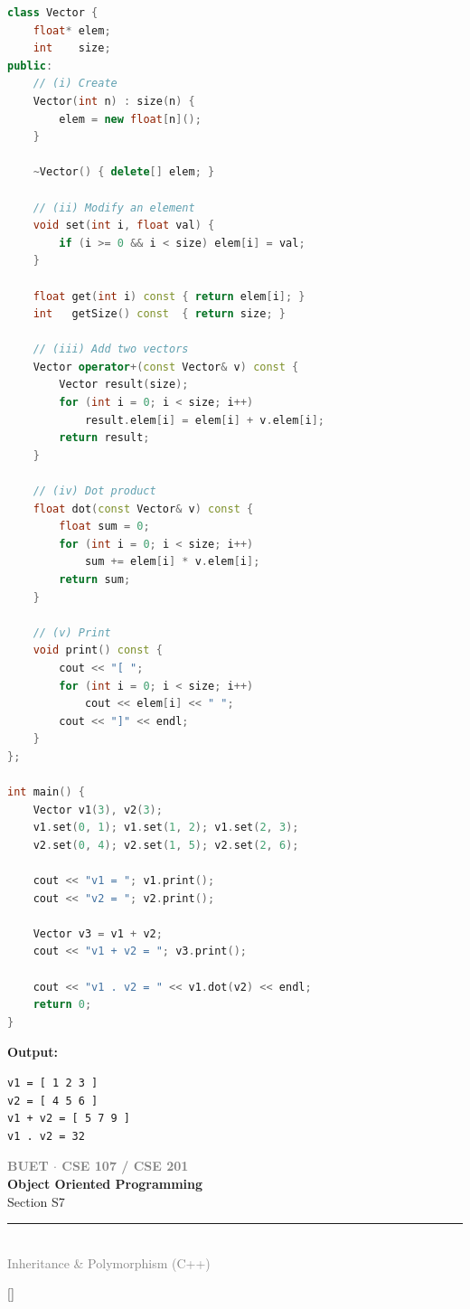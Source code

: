 \documentclass[12pt,a3paper]{article}
\newcommand{\secdivider}[4]{%
  \newpage\thispagestyle{empty}%
  \vspace*{\fill}%
  \begin{tcolorbox}[enhanced,colback=#4!7,colframe=#3,boxrule=1.5pt,arc=8pt,
    left=20pt,right=20pt,top=22pt,bottom=22pt,
    shadow={3pt}{-3pt}{0pt}{black!15}]
    \centering
    {\large\textcolor{gray}{\textbf{BUET $\cdot$ CSE 107 / CSE 201}}}\\[8pt]
    {\fontsize{26}{32}\selectfont\bfseries\textcolor{#3}{Object Oriented Programming}}\\[6pt]
    {\fontsize{15}{19}\selectfont\textcolor{dgray}{#1}}\\[12pt]
    \textcolor{#3!60}{\rule{0.5\textwidth}{0.5pt}}\\[6pt]
    {\small\textcolor{gray}{#2}}
  \end{tcolorbox}%
  \vspace*{\fill}\newpage%
}
\begin{document}
\begin{enumerate}
\begin{tcolorbox}[enhanced,breakable,ansbox,
  colback=cF!4,colframe=cF,boxrule=0.8pt,arc=5pt,
  title={\textbf{Answer --- Vector Class with Arithmetic Operations}},
  fonttitle=\bfseries\color{white},colbacktitle=cF]
\begin{lstlisting}[language=C++]
class Vector {
    float* elem;
    int    size;
public:
    // (i) Create
    Vector(int n) : size(n) {
        elem = new float[n]();
    }

    ~Vector() { delete[] elem; }

    // (ii) Modify an element
    void set(int i, float val) {
        if (i >= 0 && i < size) elem[i] = val;
    }

    float get(int i) const { return elem[i]; }
    int   getSize() const  { return size; }

    // (iii) Add two vectors
    Vector operator+(const Vector& v) const {
        Vector result(size);
        for (int i = 0; i < size; i++)
            result.elem[i] = elem[i] + v.elem[i];
        return result;
    }

    // (iv) Dot product
    float dot(const Vector& v) const {
        float sum = 0;
        for (int i = 0; i < size; i++)
            sum += elem[i] * v.elem[i];
        return sum;
    }

    // (v) Print
    void print() const {
        cout << "[ ";
        for (int i = 0; i < size; i++)
            cout << elem[i] << " ";
        cout << "]" << endl;
    }
};

int main() {
    Vector v1(3), v2(3);
    v1.set(0, 1); v1.set(1, 2); v1.set(2, 3);
    v2.set(0, 4); v2.set(1, 5); v2.set(2, 6);

    cout << "v1 = "; v1.print();
    cout << "v2 = "; v2.print();

    Vector v3 = v1 + v2;
    cout << "v1 + v2 = "; v3.print();

    cout << "v1 . v2 = " << v1.dot(v2) << endl;
    return 0;
}
\end{lstlisting}
\textbf{Output:}
\begin{verbatim}
v1 = [ 1 2 3 ]
v2 = [ 4 5 6 ]
v1 + v2 = [ 5 7 9 ]
v1 . v2 = 32
\end{verbatim}
\end{tcolorbox}


\end{enumerate}
\newpage

\secdivider{Section S7}{Inheritance \& Polymorphism (C++)}{cG}{cG}
\label{sec:S7}
\titleformat{\section}{\large\bfseries\color{cG}}{}{0em}{}[\titlerule]
\end{document}
